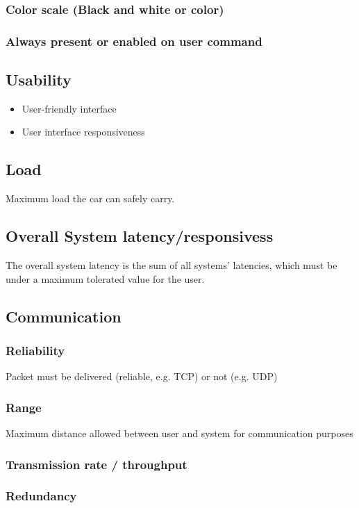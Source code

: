 \subsubsection{Color scale (Black and white or color)}
\label{sec:org468ee04}
\subsubsection{Always present or enabled on user command}
\label{sec:orgd585352}
\subsection{Usability}
\label{sec:org61632e0}
\begin{itemize}
\item User-friendly interface
\item User interface responsiveness
\end{itemize}
\subsection{Load}
\label{sec:orgca6a690}
Maximum load the car can safely carry.
\subsection{Overall System latency/responsivess}
\label{sec:org7fd1829}
The overall system latency is the sum of all systems' latencies, which must be
under a maximum tolerated value for the user.
\subsection{Communication}
\label{sec:org4241610}
\subsubsection{Reliability}
\label{sec:orgdcb920d}
Packet must be delivered (reliable, e.g. TCP) or not (e.g. UDP)
\subsubsection{Range}
\label{sec:org447a205}
Maximum distance allowed between user and system for communication purposes
\subsubsection{Transmission rate / throughput}
\label{sec:org10e75a5}
\subsubsection{Redundancy}
\label{sec:orgc5933fc}
